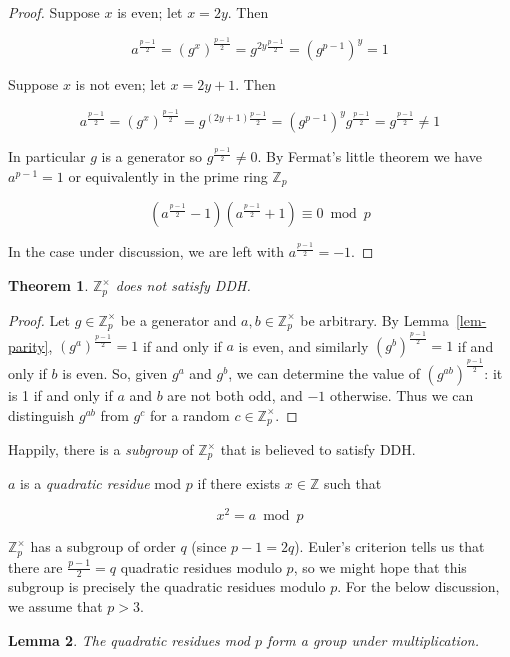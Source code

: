 \documentclass[11pt,twoside,a4paper]{article}
\newtheorem{theorem}{Theorem}[section]
\newtheorem{lemma}[theorem]{Lemma}
\theoremstyle{definition}
\begin{document}
\begin{proof}
    Suppose \(x\) is even; let \(x=2y\). Then

    \[a^{\frac{p-1}{2}}=(g^x)^{\frac{p-1}{2}}=g^{2y\frac{p-1}{2}}=(g^{p-1})^y=1\]

    Suppose \(x\) is not even; let \(x=2y+1\). Then

    \[a^{\frac{p-1}{2}}=(g^x)^{\frac{p-1}{2}}=g^{(2y+1)\frac{p-1}{2}}=(g^{p-1})^yg^{\frac{p-1}{2}}=g^{\frac{p-1}{2}}\neq 1\]

    In particular \(g\) is a generator so \(g^\frac{p-1}{2}\neq 0\). By Fermat's little theorem we have \(a^{p-1}=1\) or equivalently in the prime ring \(\mathbb{Z}_p\)

    \[\left(a^\frac{p-1}{2}-1\right)\left(a^\frac{p-1}{2}+1\right)\equiv 0\bmod p\]
    
    In the case under discussion, we are left with \(a^\frac{p-1}{2}=-1\).
\end{proof}
\begin{theorem}
    \(\mathbb{Z}^\times_p\) does not satisfy DDH.
\end{theorem}
\begin{proof}
    Let \(g\in\mathbb{Z}^\times_p\) be a generator and \(a,b\in\mathbb{Z}^\times_p\) be arbitrary. By Lemma~\ref{lem-parity}, \((g^a)^{\frac{p-1}{2}}=1\) if and only if \(a\) is even, and similarly \((g^b)^{\frac{p-1}{2}}=1\) if and only if \(b\) is even. So, given \(g^a\) and \(g^b\), we can determine the value of \(\left(g^{ab}\right)^\frac{p-1}{2}\): it is 1 if and only if \(a\) and \(b\) are not both odd, and \(-1\) otherwise. Thus we can distinguish \(g^{ab}\) from \(g^c\) for a random \(c\in\mathbb{Z}^\times_p\).
\end{proof}
Happily, there is a \textit{subgroup} of \(\mathbb{Z}^\times_p\) that is believed to satisfy DDH.
\begin{definition}
    \(a\) is a \textit{quadratic residue} mod \(p\) if there exists \(x\in\mathbb{Z}\) such that

    \[x^2=a\bmod p\]

\end{definition}
\(\mathbb{Z}^\times_p\) has a subgroup of order \(q\) (since \(p-1=2q\)). Euler's criterion tells us that there are \(\frac{p-1}{2}=q\) quadratic residues modulo \(p\), so we might hope that this subgroup is precisely the quadratic residues modulo \(p\). For the below discussion, we assume that \(p>3\).
\begin{lemma}
    The quadratic residues mod \(p\) form a group under multiplication.
\end{lemma}
\end{document}
